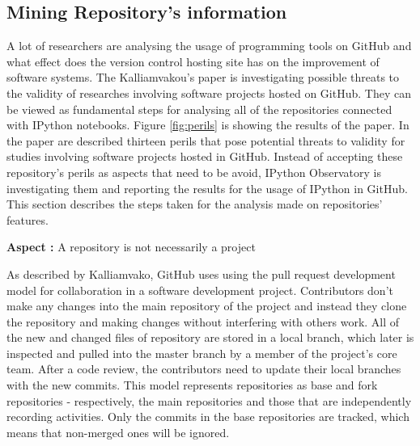 \subsection{Mining Repository's information}
\label{subsec:mining}

A lot of researchers are analysing the usage of programming tools on GitHub and what effect does the version control hosting site has on the improvement of software systems. The Kalliamvakou's paper \cite{kalliamvakoupromises} is investigating possible threats to the validity of researches involving software projects hosted on GitHub. They can be viewed as fundamental steps for analysing all of the repositories connected with IPython notebooks. Figure \ref{fig:perils} is showing the results of the paper. In the paper are described thirteen perils that pose potential threats to validity for studies involving software projects hosted in GitHub. Instead of accepting these repository's perils as aspects that need to be avoid, IPython Observatory is investigating them and reporting the results for the usage of IPython in GitHub. This section describes the steps taken for the analysis made on repositories' features.

\vspace{5mm}
\begin{mdframed}
\vspace{1px}
\textbf{Aspect :}  A repository is not necessarily a project
\vspace{1px}
\end{mdframed}
\vspace{2mm}

As described by Kalliamvako\cite{kalliamvakoupromises}, GitHub uses using the pull request development model for collaboration in a software development project. Contributors don't make any changes into the main repository of the project and instead they clone the repository and making changes without interfering with others work. All of the new and changed files of repository are stored in a local branch, which later is inspected and pulled into the master branch by a member of the project's core team. After a code review, the contributors need to update their local branches with the new commits. This model represents repositories as base and fork repositories - respectively, the main repositories and those that are independently recording activities. Only the commits in the base repositories are tracked, which means that non-merged ones will be ignored.


